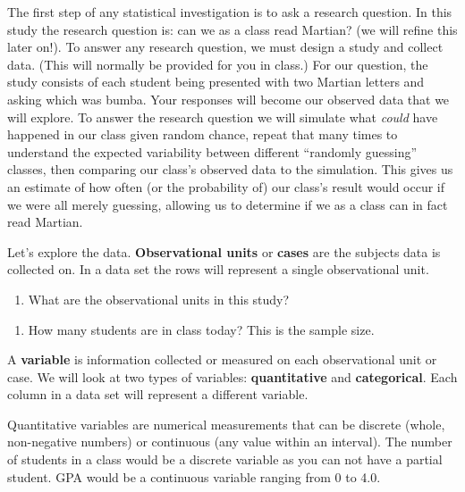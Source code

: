 \documentclass[
]{report}
\providecommand{\tightlist}{%
  \setlength{\itemsep}{0pt}\setlength{\parskip}{0pt}}
\begin{document}
The first step of any statistical investigation is to ask a research question. In this study the research question is: can we as a class read Martian? (we will refine this later on!). To answer any research question, we must design a study and collect data. (This will normally be provided for you in class.) For our question, the study consists of each student being presented with two Martian letters and asking which was bumba. Your responses will become our observed data that we will explore. To answer the research question we will simulate what \emph{could} have happened in our class given random chance, repeat that many times to understand the expected variability between different ``randomly guessing'' classes, then comparing our class's observed data to the simulation. This gives us an estimate of how often (or the probability of) our class's result would occur if we were all merely guessing, allowing us to determine if we as a class can in fact read Martian.

Let's explore the data.
\textbf{Observational units} or \textbf{cases} are the subjects data is collected on. In a data set the rows will represent a single observational unit.

\begin{enumerate}
\def\labelenumi{\arabic{enumi}.}
\tightlist
\item
  What are the observational units in this study?
\end{enumerate}

\vspace{0.5in}

\begin{enumerate}
\def\labelenumi{\arabic{enumi}.}
\setcounter{enumi}{1}
\tightlist
\item
  How many students are in class today? This is the sample size.
\end{enumerate}

\vspace{0.5in}

A \textbf{variable} is information collected or measured on each observational unit or case. We will look at two types of variables: \textbf{quantitative} and \textbf{categorical}. Each column in a data set will represent a different variable.

Quantitative variables are numerical measurements that can be discrete (whole, non-negative numbers) or continuous (any value within an interval). The number of students in a class would be a discrete variable as you can not have a partial student. GPA would be a continuous variable ranging from 0 to 4.0.
\end{document}
